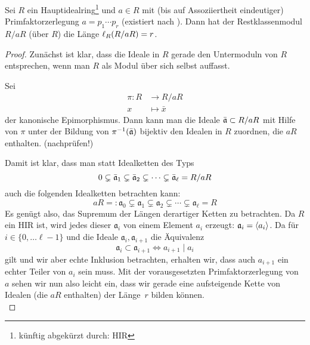 \begin{thLemma}%
    \label{lem:len:hir}
    Sei $R$ ein Hauptidealring\footnote{künftig abgekürzt durch: HIR} und $a\in
    R$ mit (bis auf Assoziiertheit eindeutiger) Primfaktorzerlegung 
    $a = p_1\cdots p_r$ (existiert nach \cite[14--16]{talk:rief}). %
    Dann hat der Restklassenmodul $R/aR$ (über $R$) die Länge $\operatorname{\ell}_{R}(R/aR) = r$.
\end{thLemma}
\begin{proof}
    Zunächst ist klar, dass die Ideale in $R$ gerade den Untermoduln von $R$
    entsprechen, wenn man $R$ als Modul über sich selbst auffasst.

    Sei 
    \begin{align*}
        \pi\colon R &\to R/aR   \\
                  x &\mapsto \bar x
    \end{align*}
    der kanonische Epimorphismus. Dann kann man die Ideale $\bar{\mathfrak{a}} \subset
    R/aR$ mit Hilfe von $\pi$ unter der Bildung von $\pi^{-1}(\bar{\mathfrak{a}})$
    bijektiv den Idealen in $R$ zuordnen, die $aR$ enthalten. (nachprüfen!)
    
    Damit ist klar, dass man statt Idealketten des Typs
    \[ 0 \subsetneq \bar{\mathfrak{a}}_1 \subsetneq \bar{\mathfrak{a}}_2 \subsetneq 
        \cdots \subsetneq \bar{\mathfrak{a}}_\ell = R/aR      \]
    auch die folgenden Idealketten betrachten kann:
    \[ aR =: \mathfrak{a}_0 \subsetneq \mathfrak{a}_1 
                \subsetneq \mathfrak{a}_2 \subsetneq 
                \cdots \subsetneq \mathfrak{a}_\ell = R        \]
    Es genügt also, das Supremum der Längen derartiger Ketten zu betrachten. Da
    $R$ ein HIR ist, wird jedes dieser $\mathfrak{a}_i$ von einem Element $a_i$
    erzeugt: $\mathfrak{a}_i = \langle a_i\rangle$. Da für $i\in\{0,\ldots \ell-1\}$ und
    die Ideale $\mathfrak{a}_i,\mathfrak{a}_{i+1}$ die Äquivalenz
    \[ \mathfrak{a}_i \subset \mathfrak{a}_{i+1} \iff a_{i+1} \mid a_i \]
    gilt und wir aber echte Inklusion betrachten, erhalten wir, dass auch
    $a_{i+1}$ ein echter Teiler von $a_i$ sein muss. Mit der vorausgesetzten
    Primfaktorzerlegung von $a$ sehen wir nun also leicht ein, dass wir gerade
    eine aufsteigende Kette von Idealen (die $aR$ enthalten) der Länge~$r$
    bilden können.
    \\
\end{proof}

